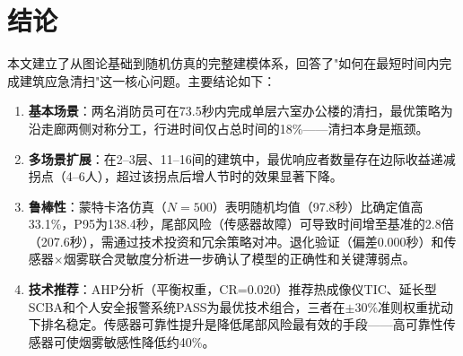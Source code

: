 \documentclass[12pt,a4paper]{ctexart}
\begin{document}
\section{结论}

本文建立了从图论基础到随机仿真的完整建模体系，回答了"如何在最短时间内完成建筑应急清扫"这一核心问题。主要结论如下：

\begin{enumerate}[nosep]
    \item \textbf{基本场景}：两名消防员可在73.5秒内完成单层六室办公楼的清扫，最优策略为沿走廊两侧对称分工，行进时间仅占总时间的18\%——清扫本身是瓶颈。
    \item \textbf{多场景扩展}：在2--3层、11--16间的建筑中，最优响应者数量存在边际收益递减拐点（4--6人），超过该拐点后增人节时的效果显著下降。
    \item \textbf{鲁棒性}：蒙特卡洛仿真（$N=500$）表明随机均值（97.8秒）比确定值高33.1\%，P95为138.4秒，尾部风险（传感器故障）可导致时间增至基准的2.8倍（207.6秒），需通过技术投资和冗余策略对冲。退化验证（偏差0.000秒）和传感器$\times$烟雾联合灵敏度分析进一步确认了模型的正确性和关键薄弱点。
    \item \textbf{技术推荐}：AHP分析（平衡权重，CR=0.020）推荐热成像仪TIC、延长型SCBA和个人安全报警系统PASS为最优技术组合，三者在$\pm$30\%准则权重扰动下排名稳定。传感器可靠性提升是降低尾部风险最有效的手段——高可靠性传感器可使烟雾敏感性降低约40\%。
\end{enumerate}

\newpage
\end{document}

